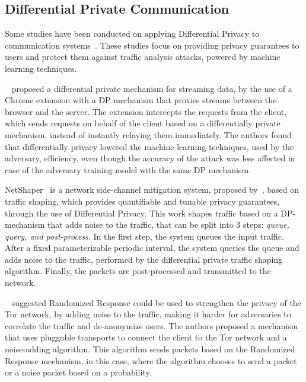 \subsection{Differential Private Communication}\label{subsec:diff_priv_comm}

Some studies have been conducted on applying Differential Privacy to communication systems~\cite{VilalongaINForum, StatPrivStreaming, NetShaper}. These studies focus on providing privacy guarantees to users and protect them against traffic analysis attacks, powered by machine learning techniques.

\citeauthor{StatPrivStreaming}~\cite{StatPrivStreaming} proposed a differential private mechanism for streaming data, by the use of a Chrome extension with a DP mechanism that proxies streams between the browser and the server. The extension intercepts the requests from the client, which sends requests on behalf of the client based on a differentially private mechanism, instead of instantly relaying them immediately. The authors found that differentially privacy lowered the machine learning techniques, used by the adversary, efficiency, even though the accuracy of the attack was less affected in case of the adversary training model with the same DP mechanism.

NetShaper~\cite{NetShaper} is a network side-channel mitigation system, proposed by~\citeauthor{NetShaper}, based on traffic shaping, which provides quantifiable and tunable privacy guarantees, through the use of Differential Privacy. This work shapes traffic based on a DP-mechanism that adds noise to the traffic, that can be split into 3 steps: \textit{queue, query, and post-process}. In the first step, the system queues the input traffic. After a fixed parameterizable periodic interval, the system queries the queue and adds noise to the traffic, performed by the differential private traffic shaping algorithm. Finally, the packets are post-processed and transmitted to the network. 

\citeauthor{VilalongaINForum}~\cite{VilalongaINForum} suggested Randomized Response could be used to strengthen the privacy of the Tor network, by adding noise to the traffic, making it harder for adversaries to correlate the traffic and de-anonymize users. The authors proposed a mechanism that uses pluggable transports to connect the client to the Tor network and a noise-adding algorithm. This algorithm sends packets based on the Randomized Response mechanism, in this case, where the algorithm chooses to send a packet or a noise packet based on a probability.

